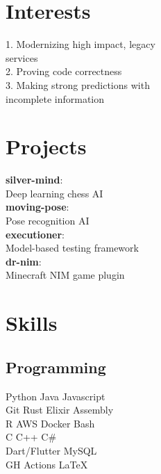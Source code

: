 \documentclass[]{darling-resume-openfont}
\begin{document}
\begin{minipage}[t]{0.33\textwidth}
\section{Interests}
1. Modernizing high impact, legacy \\
\hspace*{4mm}services \\
2. Proving code correctness \\
3. Making strong predictions with \\
\hspace*{4mm}incomplete information
\sectionsep


\section{Projects}
\textbf{silver-mind}: \\
\hspace*{2mm} Deep learning chess AI \\
\textbf{moving-pose}: \\
\hspace*{2mm} Pose recognition AI \\
\textbf{executioner}: \\
\hspace*{2mm} Model-based testing framework \\
\textbf{dr-nim}: \\
\hspace{2mm} Minecraft NIM game plugin \\
\sectionsep


\section{Skills}
\subsection{Programming}
\vspace*{0.5mm}
Python \textbullet{} Java \textbullet{} Javascript \\
\vspace*{0.75mm}
Git \textbullet{} Rust \textbullet{} Elixir \textbullet{} Assembly \textbullet{} \\
R \textbullet{} AWS \textbullet{} Docker \textbullet{} Bash \textbullet{} \\
C \textbullet{} C++ \textbullet{} C\#{} \\
\vspace*{0.75mm}
Dart/Flutter \textbullet{}  MySQL \textbullet{} \\
GH Actions \textbullet{} \LaTeX\ \\
\sectionsep

%
%

\end{minipage} 
\end{document}
